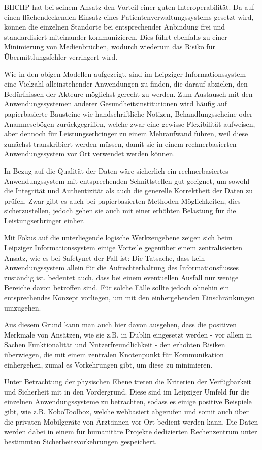 BHCHP hat bei seinem Ansatz den Vorteil einer guten Interoperabilität. Da auf einen flächendeckenden Einsatz eines Patientenverwaltungssystems gesetzt wird, können die einzelnen Standorte bei entsprechender Anbindung frei und standardisiert miteinander kommunizieren. Dies führt ebenfalls zu einer Minimierung von Medienbrüchen, wodurch wiederum das Risiko für Übermittlungsfehler verringert wird.

Wie in den obigen Modellen aufgezeigt, sind im Leipziger Informationssystem eine Vielzahl alleinstehender Anwendungen zu finden, die darauf abzielen, den Bedürfnissen der Akteure möglichst gerecht zu werden. Zum Austausch mit den Anwendungssystemen anderer Gesundheitsinstitutionen wird häufig auf papierbasierte Bausteine wie handschriftliche Notizen, Behandlungsscheine oder Anamnesebögen zurückgegriffen, welche zwar eine gewisse Flexibilität aufweisen, aber dennoch für Leistungserbringer zu einem Mehraufwand führen, weil diese zunächst transkribiert werden müssen, damit sie in einem rechnerbasierten Anwendungssystem vor Ort verwendet werden können.

In Bezug auf die Qualität der Daten wäre sicherlich ein rechnerbasiertes Anwendungssystem mit entsprechenden Schnittstellen gut geeignet, um sowohl die Integrität und Authentizität als auch die generelle Korrektheit der Daten zu prüfen. Zwar gibt es auch bei papierbasierten Methoden Möglichkeiten, dies sicherzustellen, jedoch gehen sie auch mit einer erhöhten Belastung für die Leistungserbringer einher.

Mit Fokus auf die unterliegende logische Werkzeugebene zeigen sich beim Leipziger Informationssystem einige Vorteile gegenüber einem zentralisierten Ansatz, wie es bei Safetynet der Fall ist: Die Tatsache, dass kein Anwendungssystem allein für die Aufrechterhaltung des Informationsflusses zuständig ist, bedeutet auch, dass bei einem eventuellen Ausfall nur wenige Bereiche davon betroffen sind. Für solche Fälle sollte jedoch ohnehin ein entsprechendes Konzept vorliegen, um mit den einhergehenden Einschränkungen umzugehen.

Aus diesem Grund kann man auch hier davon ausgehen, dass die positiven Merkmale von Ansätzen, wie sie z.B. in Dublin eingesetzt werden - vor allem in Sachen Funktionalität und Nutzerfreundlichkeit - den erhöhten Risiken überwiegen, die mit einem zentralen Knotenpunkt für Kommunikation einhergehen, zumal es Vorkehrungen gibt, um diese zu minimieren.

Unter Betrachtung der physischen Ebene treten die Kriterien der Verfügbarkeit und Sicherheit mit in den Vordergrund. Diese sind im Leipziger Umfeld für die einzelnen Anwendungssysteme zu betrachten, sodass es einige positive Beispiele gibt, wie z.B. KoboToolbox, welche webbasiert abgerufen und somit auch über die privaten Mobilgeräte von Ärzt:innen vor Ort bedient werden kann. Die Daten werden dabei in einem für humanitäre Projekte dedizierten Rechenzentrum unter bestimmten Sicherheitsvorkehrungen gespeichert.

